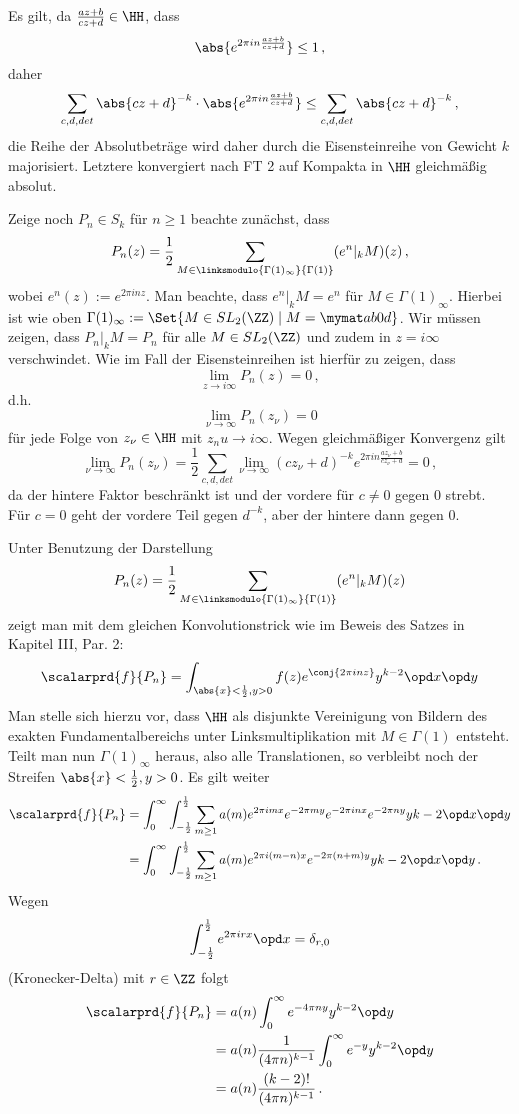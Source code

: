 \begin{bewe-list}
\item Es gilt, da $\frac{az+b}{cz+d} \in \HH$, dass
\[
	\abs{e^{2\pi i n \frac{az+b}{cz+d}}} \leq 1
	\,,
\]
daher 
\[
	\sum_{c,d,det} \abs{cz+d}^{-k} \cdot \abs{e^{2\pi i n \frac{az+b}{cz+d}}} \leq \sum_{c,d,det} \abs{cz+d}^{-k}
	\,,
\]
die Reihe der Absolutbeträge wird daher durch die Eisensteinreihe von Gewicht $k$ majorisiert. Letztere konvergiert nach FT 2 auf Kompakta in $\HH$ gleichmäßig absolut.

Zeige noch $P_n \in S_k$ für $n \geq 1$ beachte zunächst, dass 
\[
	P_n(z) = \frac 12 \sum_{M \in \linksmodulo{\Gamma(1)_\infty}{\Gamma(1)}} (e^n |_k M)(z)
	\,,
\]
wobei $e^n(z) := e^{2 \pi inz}$. Man beachte, dass $e^n |_k M = e^n$ für $M \in \Gamma(1)_\infty$. Hierbei ist wie oben $\Gamma(1)_\infty := \Set{M \in SL_2(\ZZ) \mid M = \mymat ab0d}$. Wir müssen zeigen, dass $P_n |_k M = P_n$ für alle $M \in SL_2(\ZZ)$ und zudem in $z = i \infty$ verschwindet. Wie im Fall der Eisensteinreihen ist hierfür zu zeigen, dass 
\[
	\lim_{z \to i\infty} P_n(z) = 0
	\,,
\]
d.h.
\[
	\lim_{\nu \to \infty} P_n(z_\nu) = 0
\]
für jede Folge von $z_\nu \in \HH$ mit $z_nu \to i\infty$. Wegen gleichmäßiger Konvergenz gilt
\[
	\lim_{\nu \to \infty} P_n(z_\nu) = \frac 12 \sum_{c,d,det} \lim_{\nu \to \infty} (cz_\nu + d)^{-k} e^{2\pi in \frac{az_\nu + b}{cz_\nu + d}} = 0
	\,,
\]
da der hintere Faktor beschränkt ist und der vordere für $c \neq 0$ gegen 0 strebt. Für $c = 0$ geht der vordere Teil gegen $d^{-k}$, aber der hintere dann gegen 0.

\item Unter Benutzung der Darstellung
\[
	P_n(z) = \frac 12 \sum_{M \in \linksmodulo{\Gamma(1)_\infty}{\Gamma(1)}} (e^n |_k M)(z)
\]
zeigt man mit dem gleichen \glqq{}Konvolutionstrick\grqq{} wie im Beweis des Satzes in Kapitel III, Par. 2:
\[
	\scalarprd {f}{P_n} = \int_{\abs{x} < \frac 12, y > 0} f(z) e^{\conj{2\pi inz}} y^{k-2} \opd x \opd y
\]
Man stelle sich hierzu vor, dass $\HH$ als disjunkte Vereinigung von Bildern des exakten Fundamentalbereichs unter Linksmultiplikation mit $M \in \Gamma(1)$ entsteht. Teilt man nun $\Gamma(1)_\infty$ heraus, also alle Translationen, so verbleibt noch der Streifen $\abs{x} < \frac 12, y > 0$. Es gilt weiter
\begin{align*}
	\scalarprd {f}{P_n} &= \int_0^\infty \int_{-\frac 12}^{\frac 12} \sum_{m \geq 1} a(m) e^{2 \pi imx}e^{-2\pi my}e^{-2\pi inx}e^{-2\pi ny}y{k-2} \opd x \opd y\\
	&= \int_0^\infty \int_{-\frac 12}^{\frac 12} \sum_{m \geq 1} a(m) e^{2 \pi i(m-n)x}e^{-2\pi (n+m)y}y{k-2} \opd x \opd y\,.
\end{align*}
Wegen 
\[
	\int_{- \frac 12}^{\frac 12} e^{2 \pi irx} \opd x = \delta_{r,0}
\]
(Kronecker-Delta) mit $r \in \ZZ$ folgt
\begin{align*}
	\scalarprd {f}{P_n} &= a(n) \int_0^\infty e^{-4\pi ny} y^{k-2} \opd y \\&= a(n) \frac{1}{(4\pi n)^{k-1}} \int_0^\infty e^{-y} y^{k-2} \opd y \\
	&= a(n) \frac{(k-2)!}{(4\pi n)^{k-1}} \,.
\end{align*}
\end{bewe-list}


